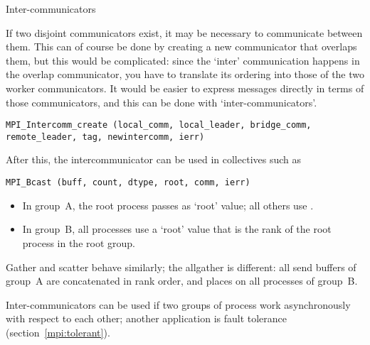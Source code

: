 
 {Inter-communicators}

If two disjoint communicators exist, it may be necessary to
communicate between them. This can of course be done by creating a new
communicator that overlaps them, but this would be complicated: since
the `inter' communication happens in the overlap communicator, you
have to translate its ordering into those of the two worker
communicators. It would be easier to express messages directly in
terms of those communicators, and this can be done with
`inter-communicators'.

\begin{lstlisting}
MPI_Intercomm_create (local_comm, local_leader, bridge_comm, remote_leader, tag, newintercomm, ierr)
\end{lstlisting}
After this, the intercommunicator can be used in collectives such as
\begin{lstlisting}
MPI_Bcast (buff, count, dtype, root, comm, ierr)
\end{lstlisting}
\begin{itemize}
\item In group~A, the root process passes  as
  `root' value; all others use .
\item In group~B, all processes use a `root' value that is the
  rank of the root process in the root group.
\end{itemize}
Gather and scatter behave similarly; the allgather is different: all
send buffers of group~A are concatenated in rank order, and places on
all processes of group~B.

Inter-communicators can be used if two groups of process work
asynchronously with respect to each other; another application is
fault tolerance (section~\ref{mpi:tolerant}).


